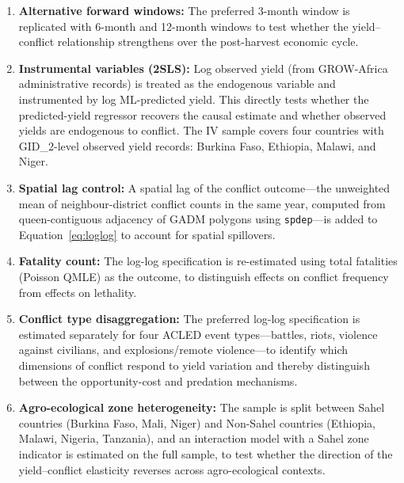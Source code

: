 \begin{enumerate}
  \item \textbf{Alternative forward windows:} The preferred 3-month window is replicated with 6-month and 12-month windows to test whether the yield--conflict relationship strengthens over the post-harvest economic cycle.
  \item \textbf{Instrumental variables (2SLS):} Log observed yield (from GROW-Africa administrative records) is treated as the endogenous variable and instrumented by log ML-predicted yield. This directly tests whether the predicted-yield regressor recovers the causal estimate and whether observed yields are endogenous to conflict. The IV sample covers four countries with GID_2-level observed yield records: Burkina Faso, Ethiopia, Malawi, and Niger.
  \item \textbf{Spatial lag control:} A spatial lag of the conflict outcome---the unweighted mean of neighbour-district conflict counts in the same year, computed from queen-contiguous adjacency of GADM polygons using \texttt{spdep}---is added to Equation~\ref{eq:loglog} to account for spatial spillovers.
  \item \textbf{Fatality count:} The log-log specification is re-estimated using total fatalities (Poisson QMLE) as the outcome, to distinguish effects on conflict frequency from effects on lethality.
  \item \textbf{Conflict type disaggregation:} The preferred log-log specification is estimated separately for four ACLED event types---battles, riots, violence against civilians, and explosions/remote violence---to identify which dimensions of conflict respond to yield variation and thereby distinguish between the opportunity-cost and predation mechanisms.
  \item \textbf{Agro-ecological zone heterogeneity:} The sample is split between Sahel countries (Burkina Faso, Mali, Niger) and Non-Sahel countries (Ethiopia, Malawi, Nigeria, Tanzania), and an interaction model with a Sahel zone indicator is estimated on the full sample, to test whether the direction of the yield--conflict elasticity reverses across agro-ecological contexts.
\end{enumerate}
